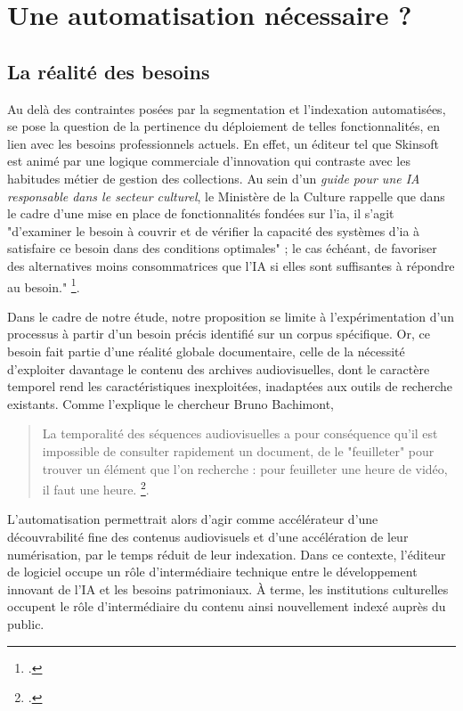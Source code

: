 \section{\label{III_3_C} Une automatisation nécessaire ?}

\subsection{La réalité des besoins}
Au delà des contraintes posées par la segmentation et l'indexation automatisées, se pose la question de la pertinence du déploiement de telles fonctionnalités, en lien avec les besoins professionnels actuels. En effet, un éditeur tel que Skinsoft est animé par une logique commerciale d'innovation qui contraste avec les habitudes métier de gestion des collections. Au sein d'un \textit{guide pour une IA responsable dans le secteur culturel}, le Ministère de la Culture rappelle que dans le cadre d'une mise en place de fonctionnalités fondées sur l'\gls{ia}, il s'agit "d’examiner le besoin à couvrir et de vérifier la capacité des systèmes d’\gls{ia} à satisfaire ce besoin dans des conditions optimales" ; le cas échéant, de favoriser des alternatives moins consommatrices que l’IA si elles sont suffisantes à répondre au besoin." \footcite{2025a}.

Dans le cadre de notre étude, notre proposition se limite à l'expérimentation d'un processus à partir d'un besoin précis identifié sur un corpus spécifique. Or, ce besoin fait partie d'une réalité globale documentaire, celle de la nécessité d'exploiter davantage le contenu des archives audiovisuelles, dont le caractère temporel rend les caractéristiques inexploitées, inadaptées aux outils de recherche existants. Comme l'explique le chercheur Bruno Bachimont, 
\begin{quote} 
	La temporalité des séquences audiovisuelles a pour conséquence qu’il est impossible de consulter rapidement un document, de le "feuilleter" pour trouver un élément que l’on recherche : pour feuilleter une heure de vidéo, il faut une heure. \footcite{bachimont1998}. 
\end{quote} 

L'automatisation permettrait alors d'agir comme accélérateur d'une découvrabilité fine des contenus audiovisuels et d'une accélération de leur numérisation, par le temps réduit de leur indexation. Dans ce contexte,  l'éditeur de logiciel occupe un rôle d'intermédiaire technique entre le développement innovant de l'IA et les besoins patrimoniaux. À terme, les institutions culturelles occupent le rôle d'intermédiaire du contenu ainsi nouvellement indexé auprès du public. 

